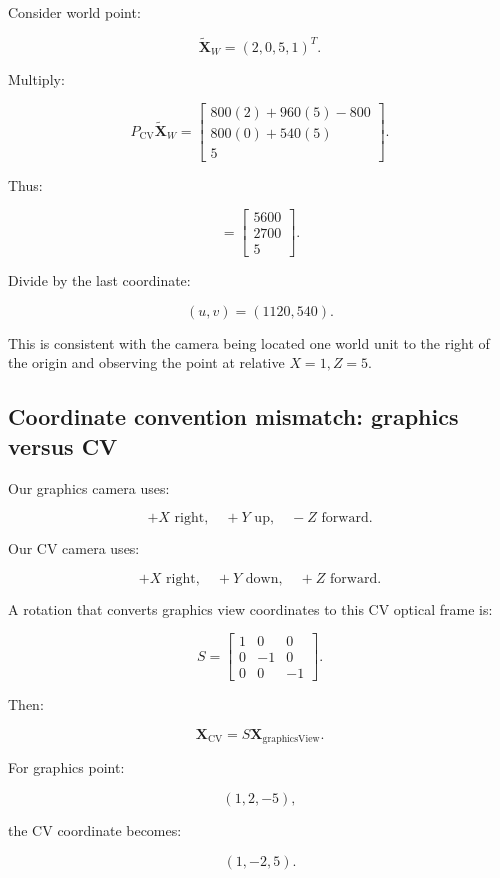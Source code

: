 Consider world point:

\[
 \tilde{\mathbf X}_W=(2,0,5,1)^T.
\]

Multiply:

\[
 P_{\mathrm{CV}}\tilde{\mathbf X}_W = \begin{bmatrix} 800(2)+960(5)-800\\ 800(0)+540(5)\\ 5 \end{bmatrix}.
\]

Thus:

\[
 = \begin{bmatrix} 5600\\2700\\5 \end{bmatrix}.
\]

Divide by the last coordinate:

\[
 \boxed{ (u,v)=(1120,540) }.
\]

This is consistent with the camera being located one world unit to the right of the origin and observing the point at relative \(X=1,Z=5\).

\subsection{Coordinate convention mismatch: graphics versus CV}\label{02-foundations-ii-ch035-coordinate-convention-mismatch-graphics-versus-cv}

Our graphics camera uses:

\[
 +X\text{ right},\quad+Y\text{ up},\quad-Z\text{ forward}.
\]

Our CV camera uses:

\[
 +X\text{ right},\quad+Y\text{ down},\quad+Z\text{ forward}.
\]

A rotation that converts graphics view coordinates to this CV optical frame is:

\[
 \boxed{ S= \begin{bmatrix} 1&0&0\\ 0&-1&0\\ 0&0&-1 \end{bmatrix} }.
\]

Then:

\[
 \boxed{ \mathbf X_{\mathrm{CV}}=S\mathbf X_{\mathrm{graphicsView}} }.
\]

For graphics point:

\[
 (1,2,-5),
\]

the CV coordinate becomes:

\[
 \boxed{(1,-2,5)}.
\]

